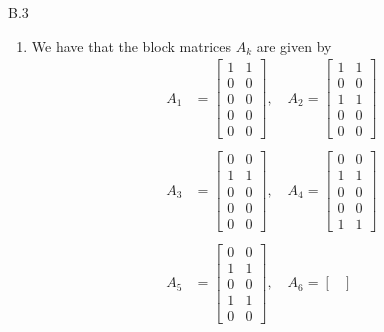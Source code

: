 \documentclass[a4paper]{article}
\begin{document}
  \begin{exercise}{B.3}
    \begin{enumerate}[label=(\roman*)]
      \item
        We have that the block matrices $ A_k $ are given by
        \begin{align*}
          A_1 &= \begin{bmatrix}
            1 & 1 \\
            0 & 0 \\
            0 & 0 \\
            0 & 0 \\
            0 & 0
            \end{bmatrix},\quad A_2 = \begin{bmatrix}
            1 & 1 \\
            0 & 0 \\
            1 & 1 \\
            0 & 0 \\
            0 & 0
          \end{bmatrix} \\ \\
            A_3 &= \begin{bmatrix}
              0 & 0 \\
              1 & 1 \\
              0 & 0 \\
              0 & 0 \\
              0 & 0
              \end{bmatrix},\quad A_4 = \begin{bmatrix}
              0 & 0 \\
              1 & 1 \\
              0 & 0 \\
              0 & 0 \\
              1 & 1
            \end{bmatrix} \\ \\
              A_5 &= \begin{bmatrix}
                0 & 0 \\
                1 & 1 \\
                0 & 0 \\
                1 & 1 \\
                0 & 0
                \end{bmatrix},\quad A_6 = \begin{bmatrix}

\end{bmatrix}
\end{align*}
\end{enumerate}
\end{exercise}
\end{document}
